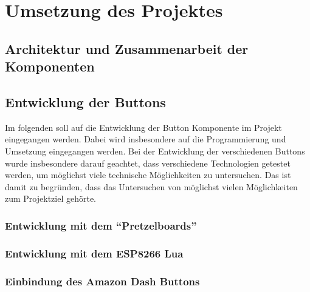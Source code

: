 \documentclass[ngerman]{scrartcl} %
\begin{document}

\newpage

\section{Umsetzung des Projektes}        
\label{sec:Umsetzung des Projektes-1}  

\subsection{Architektur und Zusammenarbeit der Komponenten}        
\label{sec:Architektur und Zusammenarbeit der Komponenten-1} 



\newpage

\subsection{Entwicklung der Buttons}  
\label{sec:Entwicklung der Buttons-1} 

Im folgenden soll auf die Entwicklung der Button Komponente im Projekt eingegangen werden. Dabei wird insbesondere auf die Programmierung und Umsetzung eingegangen werden. 
Bei der Entwicklung der verschiedenen Buttons wurde insbesondere darauf geachtet, dass verschiedene Technologien getestet werden, um möglichst viele technische Möglichkeiten zu untersuchen. Das ist damit zu begründen, dass das Untersuchen von möglichst vielen Möglichkeiten zum Projektziel gehörte. 

\subsubsection{Entwicklung mit dem ``Pretzelboards''}  
\label{sec:Entwicklung mit dem ``Pretzelboards''-1}

\subsubsection{Entwicklung mit dem ESP8266 Lua}  
\label{sec:Entwicklung mit dem ESP8266-1}

\subsubsection{Einbindung des Amazon Dash Buttons}  
\label{sec:Einbindung des Amazon Dash Buttons-1}

\newpage
\end{document}
